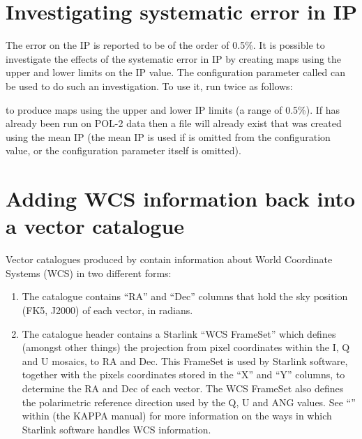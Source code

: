\section{Investigating systematic error in IP}


The error on the IP is reported to be of the order of 0.5\%.  It is
possible to investigate the effects of the systematic error in IP by
creating maps using the upper and lower limits on the IP value. The
 configuration parameter called 
can be used to do such an
investigation. To use it, run  twice as follows:

\begin{terminalv}
\end{terminalv}

to produce maps using the upper and lower IP limits (a range of
0.5\%). If  has already been run on POL-2 data then a file will
already exist that was created using the mean IP (the mean IP is used
if  is omitted from the configuration value, or the
configuration parameter itself is omitted).



\section{\label{sec:wcscopy}Adding WCS information back into a vector catalogue}
Vector catalogues produced by  contain information about World Coordinate
Systems (WCS) in two different forms:

\begin{enumerate}
\item The catalogue contains ``RA'' and ``Dec'' columns that hold the sky position
(FK5, J2000) of each vector, in radians.
\item The catalogue header contains a Starlink ``WCS FrameSet'' which defines
(amongst other things) the projection from pixel coordinates within the I, Q and
U mosaics, to RA and Dec. This FrameSet is used by Starlink software, together
with the pixels coordinates stored in the ``X'' and ``Y'' columns, to determine
the RA and Dec of each vector. The WCS FrameSet also defines the polarimetric
reference direction used by the Q, U and ANG values. See
``''
within  (the KAPPA manual) for more information on
the ways in which Starlink software handles WCS information.
\end{enumerate}

